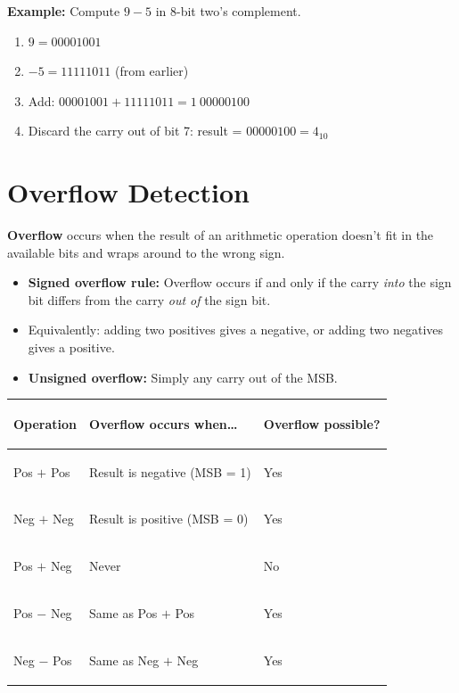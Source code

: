 \documentclass[11pt, letterpaper]{article}
\begin{document}
\begin{tcolorbox}[colback=part2bg, colframe=sectiongreen, arc=3pt, boxrule=1pt]
\textbf{Example:} Compute $9 - 5$ in 8-bit two's complement.
\begin{enumerate}[noitemsep, leftmargin=*]
  \item $9 = 00001001$
  \item $-5 = 11111011$ (from earlier)
  \item Add: $00001001 + 11111011 = 1\ 00000100$
  \item Discard the carry out of bit 7: result = $00000100 = 4_{10}$ \checkmark
\end{enumerate}
\end{tcolorbox}

\section*{Overflow Detection}

\textbf{Overflow} occurs when the result of an arithmetic operation doesn't fit in the available bits and wraps around to the wrong sign.

\begin{itemize}[noitemsep]
  \item \textbf{Signed overflow rule:} Overflow occurs if and only if the carry \emph{into} the sign bit differs from the carry \emph{out of} the sign bit.
  \item Equivalently: adding two positives gives a negative, or adding two negatives gives a positive.
  \item \textbf{Unsigned overflow:} Simply any carry out of the MSB.
\end{itemize}

\noindent
{\renewcommand{\arraystretch}{1.5}
\begin{tabularx}{\textwidth}{>{\bfseries\raggedright\arraybackslash}p{3.5cm}
                              >{\raggedright\arraybackslash}X
                              >{\centering\arraybackslash}p{2.5cm}}
\toprule
\rowcolor{tableheadergreen}
\textbf{Operation} & \textbf{Overflow occurs when\ldots} & \textbf{Overflow possible?} \\
\midrule
\rowcolor{rowA}  Pos $+$ Pos & Result is negative (MSB = 1) & Yes \\
\rowcolor{rowBg} Neg $+$ Neg & Result is positive (MSB = 0) & Yes \\
\rowcolor{rowA}  Pos $+$ Neg & Never & No \\
\rowcolor{rowBg} Pos $-$ Neg & Same as Pos $+$ Pos & Yes \\
\rowcolor{rowA}  Neg $-$ Pos & Same as Neg $+$ Neg & Yes \\
\bottomrule
\end{tabularx}}
\end{document}
